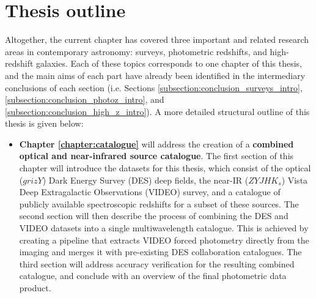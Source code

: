 \section{Thesis outline}
Altogether, the current chapter has covered three important and related research areas in contemporary astronomy: surveys, photometric redshifts, and high-redshift galaxies. Each of these topics corresponds to one chapter of this thesis, and the main aims of each part have already been identified in the intermediary conclusions of each section (i.e. Sections \ref{subsection:conclusion_surveys_intro}, \ref{subsection:conclusion_photoz_intro}, and \ref{subsection:conclusion_high_z_intro}). A more detailed structural outline of this thesis is given below: 


\begin{itemize}
    \item \textbf{Chapter \ref{chapter:catalogue}} will address the creation of a \textbf{combined optical and near-infrared source catalogue}. The first section of this chapter will introduce the datasets for this thesis, which consist of the optical ($grizY$) Dark Energy Survey (DES) deep fields, the near-IR ($ZYJHK_{s}$) Vista Deep Extragalactic Observations (VIDEO) survey, and a catalogue of publicly available spectroscopic redshifts for a subset of these sources. The second section will then describe the process of combining the DES and VIDEO datasets into a single multiwavelength catalogue. This is achieved by creating a pipeline that extracts VIDEO forced photometry directly from the imaging and merges it with pre-existing DES collaboration catalogues. The third section will address accuracy verification for the resulting combined \DESVIDEO catalogue, and conclude with an overview of the final photometric data product.
    

\end{itemize}
